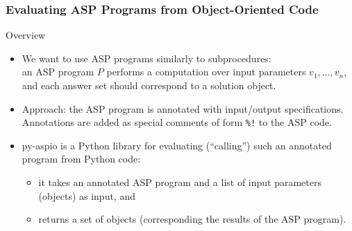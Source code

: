 \documentclass[%
beamer,%
english,%
10pt,%
]{beamer}
\newcommand{\blue}[1]{{\color{blue}#1}}
\begin{document}
\begin{frame}
    \frametitle{Evaluating ASP Programs from Object-Oriented Code}

    \begin{block}{Overview}
        \begin{itemize}
            \item We want to use ASP programs similarly to \blue{subprocedures}: \\
                an ASP program $P$ performs a computation over input parameters $v_1, \ldots, v_n$, and each answer set should correspond to a solution object.
            \bigskip
            \item Approach: the ASP program is \blue{annotated} with \blue{input/output specifications}. \\
                Annotations are added as \blue{special comments} of form \blue{\tt \%!} to the ASP code.
            \bigskip
            \item \blue{py-aspio} is a Python library for \blue{evaluating} (``calling'')
                such an annotated program from Python code:
                \begin{itemize}
                    \item it takes an \blue{annotated ASP program} and a \blue{list of input parameters} (objects) as input, and
                    \item returns a \blue{set of objects} (corresponding the results of the ASP program).
                \end{itemize}
        \end{itemize}
    \end{block}
\end{frame}


\end{document}
